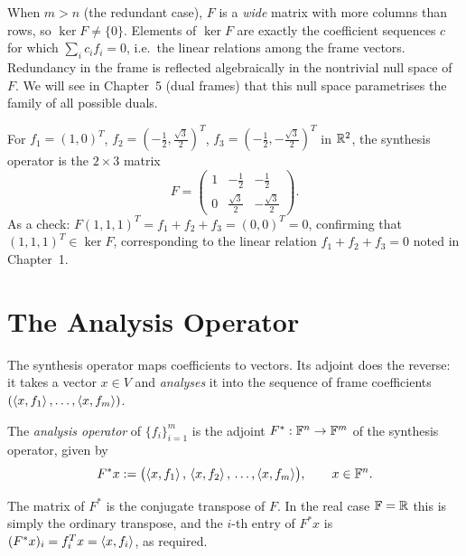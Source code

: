 \begin{remark*}
When $m > n$ (the redundant case), $F$ is a \emph{wide} matrix with more
columns than rows, so $\ker F \ne \{0\}$. Elements of $\ker F$ are
exactly the coefficient sequences $c$ for which $\sum_i c_i f_i = 0$,
i.e.\ the linear relations among the frame vectors. Redundancy in the
frame is reflected algebraically in the nontrivial null space of $F$. We
will see in Chapter~5 (dual frames) that this null space parametrises the
family of all possible duals.
\end{remark*}

\begin{examplebox}[title={Example 3.1: Synthesis matrix of the triangular frame}]
\label{ex:synthesis-triangle}
For $f_1=(1,0)^T$,
$f_2=(-\tfrac12,\tfrac{\sqrt3}{2})^T$,
$f_3=(-\tfrac12,-\tfrac{\sqrt3}{2})^T$ in $\mathbb{R}^2$, the synthesis operator
is the $2\times 3$ matrix
\[
  F =
  \begin{pmatrix}
    1 & -\tfrac{1}{2} & -\tfrac{1}{2} \\[4pt]
    0 & \tfrac{\sqrt{3}}{2} & -\tfrac{\sqrt{3}}{2}
  \end{pmatrix}.
\]
As a check: $F(1,1,1)^T = f_1+f_2+f_3 = (0,0)^T = 0$, confirming that
$(1,1,1)^T\in\ker F$, corresponding to the linear relation $f_1+f_2+f_3=0$
noted in Chapter~1.
\end{examplebox}

\section{The Analysis Operator}
\label{sec:analysis-operator}

The synthesis operator maps coefficients to vectors. Its adjoint does the
reverse: it takes a vector $x\in V$ and \emph{analyses} it into the
sequence of frame coefficients $(\left\langle x, f_1 \right\rangle,\ldots,\left\langle x, f_m \right\rangle)$.

\begin{definition}
\label{def:analysis-operator}
The \emph{analysis operator} of $\{f_i\}_{i=1}^m$ is the adjoint
$F^*:\mathbb{F}^n\to\mathbb{F}^m$ of the synthesis operator, given by
\[
  F^* x :=
  \bigl(\left\langle x, f_1 \right\rangle,\,\left\langle x, f_2 \right\rangle,\,\ldots,\left\langle x, f_m \right\rangle\bigr),
  \qquad x\in\mathbb{F}^n.
\]
\end{definition}

The matrix of $F^*$ is the conjugate transpose of $F$. In the real case
$\mathbb{F}=\mathbb{R}$ this is simply the ordinary transpose, and the $i$-th entry of
$F^*x$ is $(F^*x)_i = f_i^T x = \left\langle x, f_i \right\rangle$, as required.

